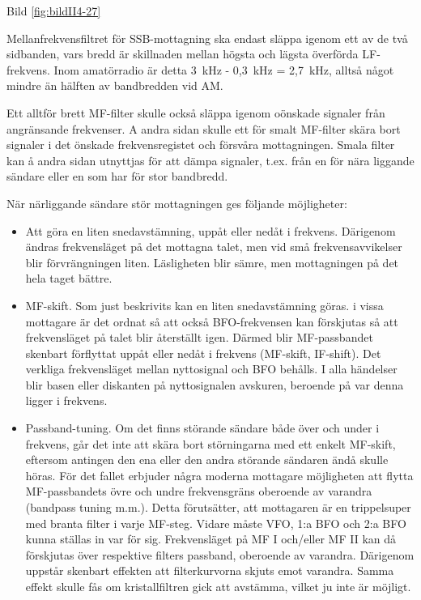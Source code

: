 Bild \ref{fig:bildII4-27}

Mellanfrekvensfiltret för SSB-mottagning ska endast släppa igenom
ett av de två sidbanden, vars bredd är skillnaden mellan högsta och
lägsta överförda LF-frekvens. Inom amatörradio är detta 3~kHz - 0,3~kHz
= 2,7~kHz, alltså något mindre än hälften av bandbredden vid AM.

Ett alltför brett MF-filter skulle också släppa igenom oönskade
signaler från angränsande frekvenser. A andra sidan skulle ett för
smalt MF-filter skära bort signaler i det önskade frekvensregistet och
försvåra mottagningen. Smala filter kan å andra sidan utnyttjas för
att dämpa signaler, t.ex. från en för nära liggande sändare eller en som
har för stor bandbredd.

När närliggande sändare stör mottagningen ges följande möjligheter:
\begin{itemize}
  \item Att göra en liten snedavstämning, uppåt eller nedåt i
    frekvens. Därigenom ändras frekvensläget på det mottagna talet,
    men vid små frekvensavvikelser blir förvrängningen
    liten. Läsligheten blir sämre, men mottagningen på det hela taget
    bättre.

  \item MF-skift. Som just beskrivits kan en liten snedavstämning
    göras. i vissa mottagare är det ordnat så att också BFO-frekvensen
    kan förskjutas så att frekvensläget på talet blir återställt
    igen. Därmed blir MF-passbandet skenbart förflyttat uppåt
    eller nedåt i frekvens (MF-skift, IF-shift).  Det verkliga
    frekvensläget mellan nyttosignal och BFO behålls. I alla händelser
    blir basen eller diskanten på nyttosignalen avskuren, beroende på
    var denna ligger i frekvens.

  \item Passband-tuning. Om det finns störande sändare både över och
    under i frekvens, går det inte att skära bort störningarna med ett
    enkelt MF-skift, eftersom antingen den ena eller den andra
    störande sändaren ändå skulle höras. För det fallet erbjuder några
    moderna mottagare möjligheten att flytta MF-passbandets övre och
    undre frekvensgräns oberoende av varandra (bandpass tuning
    m.m.). Detta förutsätter, att mottagaren är en trippelsuper med
    branta filter i varje MF-steg.  Vidare måste VFO, 1:a BFO och 2:a
    BFO kunna ställas in var för sig. Frekvensläget på MF I och/eller
    MF II kan då förskjutas över respektive filters passband,
    oberoende av varandra. Därigenom uppstår skenbart effekten att
    filterkurvorna skjuts emot varandra. Samma effekt skulle fås om
    kristallfiltren gick att avstämma, vilket ju inte är möjligt.
\end{itemize}


